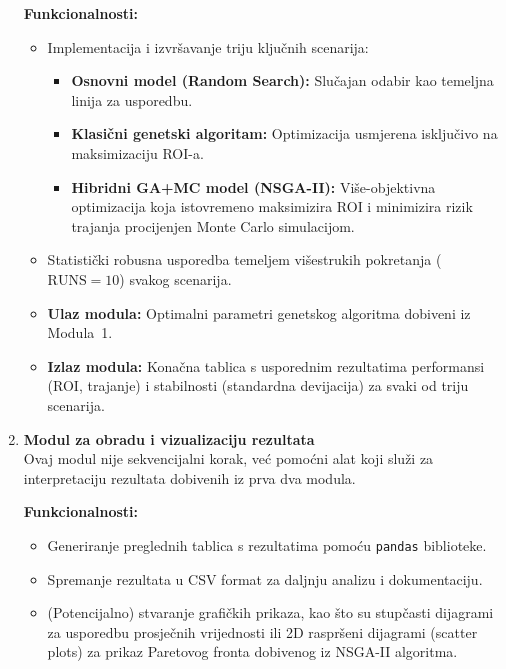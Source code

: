 \begin{enumerate}
    \textbf{Funkcionalnosti:}
    \begin{itemize}
        \item Implementacija i izvršavanje triju ključnih scenarija:
        \begin{itemize}
            \item \textbf{Osnovni model (Random Search):} Slučajan odabir kao temeljna linija za usporedbu.
            \item \textbf{Klasični genetski algoritam:} Optimizacija usmjerena isključivo na maksimizaciju ROI-a.
            \item \textbf{Hibridni GA+MC model (NSGA-II):} Više-objektivna optimizacija koja istovremeno maksimizira ROI i minimizira rizik trajanja procijenjen Monte Carlo simulacijom.
        \end{itemize}
        \item Statistički robusna usporedba temeljem višestrukih pokretanja (\( \text{RUNS} = 10 \)) svakog scenarija.
        \item \textbf{Ulaz modula:} Optimalni parametri genetskog algoritma dobiveni iz Modula~1.
        \item \textbf{Izlaz modula:} Konačna tablica s usporednim rezultatima performansi (ROI, trajanje) i stabilnosti (standardna devijacija) za svaki od triju scenarija.
    \end{itemize}

    \item \textbf{Modul za obradu i vizualizaciju rezultata} \\
    Ovaj modul nije sekvencijalni korak, već pomoćni alat koji služi za interpretaciju rezultata dobivenih iz prva dva modula.
    
    \textbf{Funkcionalnosti:}
    \begin{itemize}
        \item Generiranje preglednih tablica s rezultatima pomoću \texttt{pandas} biblioteke.
        \item Spremanje rezultata u CSV format za daljnju analizu i dokumentaciju.
        \item (Potencijalno) stvaranje grafičkih prikaza, kao što su stupčasti dijagrami za usporedbu prosječnih vrijednosti ili 2D raspršeni dijagrami (scatter plots) za prikaz Paretovog fronta dobivenog iz NSGA-II algoritma.
    \end{itemize}
\end{enumerate}

